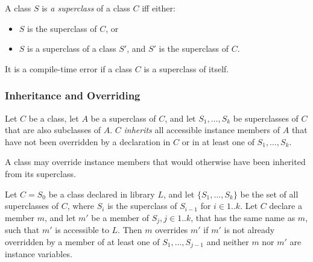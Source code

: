\documentclass{article}
\begin{document}
\LMHash{}
A class $S$ is {\em a superclass} of a class $C$ if{}f either:
\begin{itemize}
\item $S$ is the superclass of $C$, or
\item $S$ is a superclass of a class $S'$,
and $S'$ is the superclass of $C$.
\end{itemize}

\LMHash{}
It is a compile-time error if a class $C$ is a superclass of itself.


\subsubsection{Inheritance and Overriding}


\LMHash{}
Let $C$ be a class, let $A$ be a superclass of $C$, and let $S_1, \ldots, S_k$ be superclasses of $C$ that are also subclasses of $A$.
$C$ {\em inherits} all accessible instance members of $A$ that have not been overridden by a declaration in $C$ or in at least one of $S_1, \ldots, S_k$.


\LMHash{}
A class may override instance members that would otherwise have been inherited from its superclass.

\LMHash{}
Let $C = S_0$ be a class declared in library $L$, and let $\{S_1, \ldots, S_k\}$ be the set of all superclasses of $C$, where $S_i$ is the superclass of $S_{i-1}$ for $i \in 1 .. k$.
Let $C$ declare a member $m$, and let $m'$ be a member of $S_j, j \in 1 .. k$, that has the same name as $m$, such that $m'$ is accessible to $L$.
Then $m$ overrides $m'$ if $m'$ is not already overridden by a member of at least one of $S_1, \ldots, S_{j-1}$ and neither $m$ nor $m'$ are instance variables.

\end{document}
